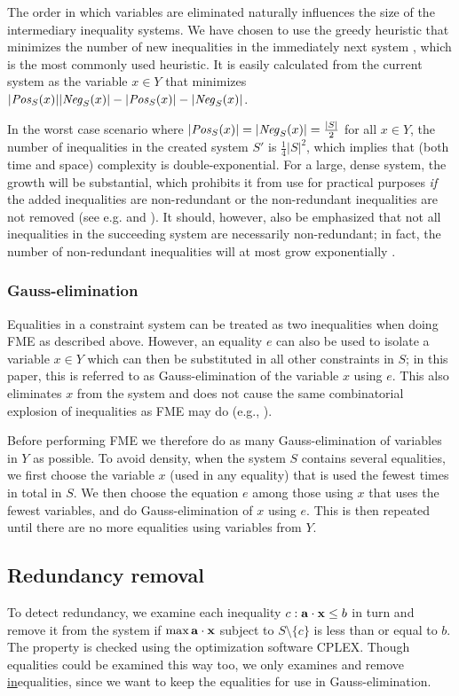 The order in which variables are eliminated naturally influences the size of the intermediary inequality systems. We have chosen to use the greedy heuristic {that minimizes the number of new inequalities in the immediately next system \cite{duffin74}}, which is the most commonly used heuristic. It is easily calculated from the current system as the variable $x\in Y$ that minimizes $|\mathit{Pos}_S(x)||\mathit{Neg}_S(x)| - |\mathit{Pos}_S(x)|-|\mathit{Neg}_S(x)|$. 


In the worst case scenario where $|\mathit{Pos}_S(x)| = |\mathit{Neg}_S(x)| = \frac{|S|}{2}$ for all $x\in Y$, the number of inequalities in the created system $S'$ is $\frac{1}{4}|S|^2$, which implies that (both time and space) complexity is double-exponential. For a large, dense system, the growth will be substantial, which prohibits it from use for practical purposes \emph{if} the added inequalities are non-redundant or the non-redundant inequalities are not removed ({see e.g. \cite{lassez93} and \cite{lukatskii08}}). It should, however, also be emphasized that not all inequalities in the succeeding system are necessarily non-redundant; in fact, the number of non-redundant inequalities will at most grow exponentially \cite{monniaux10}.

\subsubsection{Gauss-elimination}
Equalities in a constraint system can be treated as two inequalities when doing FME as described above. However, an equality $e$ can also be used to isolate a variable $x\in Y$ which can then be substituted in all other constraints in $S$; in this paper, this is referred to as Gauss-elimination of the variable $x$ using $e$. This also eliminates $x$ from the system and does not cause the same combinatorial explosion of inequalities as FME may do (e.g., \cite{duffin74,simon05}). 

Before performing FME we therefore do as many Gauss-elimination of variables in $Y$ as possible.
%
To avoid density, when the system $S$ contains several equalities, we first choose the variable $x$ (used in any equality) that is used the fewest times in total in $S$. We then choose the equation $e$ among those using $x$ that uses the fewest variables, and do Gauss-elimination of $x$ using $e$. 
This is then repeated until there are no more equalities using variables from $Y$.
 
\subsection{Redundancy removal}
To detect redundancy, we examine each inequality $c: \mathbf{a}\cdot \mathbf{x}\leq b$ in turn and remove it from the system if $\max \mathbf{a}\cdot \mathbf{x}$ subject to $S\setminus\{c\}$ is less than or equal to $b$. The property is checked using the optimization software CPLEX. Though equalities could be examined this way too, we only examines and remove \underline{in}equalities, since we want to keep the equalities for use in Gauss-elimination.

